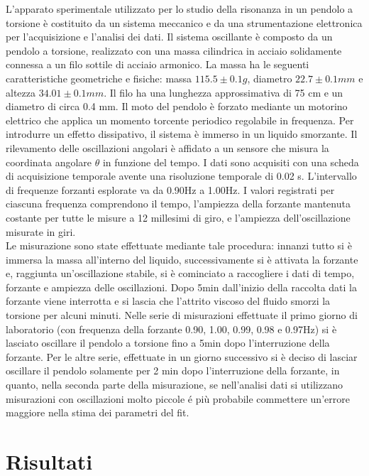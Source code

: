 \documentclass{article}
\begin{document}
L’apparato sperimentale utilizzato per lo studio della risonanza in un pendolo a torsione è costituito da un sistema meccanico e da una strumentazione elettronica per l’acquisizione e l’analisi dei dati. Il sistema oscillante è composto da un pendolo a torsione, realizzato con una massa cilindrica in acciaio solidamente connessa a un filo sottile di acciaio armonico. La massa ha le seguenti caratteristiche geometriche e fisiche: massa $115.5\pm0.1g$, diametro $22.7\pm0.1mm$ e altezza $34.01\pm0.1mm$. Il filo ha una lunghezza approssimativa di 75 cm e un diametro di circa 0.4 mm.
Il moto del pendolo è forzato mediante un motorino elettrico che applica un momento torcente periodico regolabile in frequenza. Per introdurre un effetto dissipativo, il sistema è immerso in un liquido smorzante.
Il rilevamento delle oscillazioni angolari è affidato a un sensore che misura la coordinata angolare $\theta$ in funzione del tempo. I dati sono acquisiti con una scheda di acquisizione temporale avente una risoluzione temporale di 0.02 s. L’intervallo di frequenze forzanti esplorate va da 0.90Hz a 1.00Hz. I valori registrati per ciascuna frequenza comprendono il tempo, l’ampiezza della forzante mantenuta costante per tutte le misure a 12 millesimi di giro, e l’ampiezza dell’oscillazione misurate in giri.
\\
Le misurazione sono state effettuate mediante tale procedura: innanzi tutto si è immersa la massa all'interno del liquido, successivamente si è attivata la forzante e, raggiunta un'oscillazione stabile, si è cominciato a raccogliere i dati di tempo, forzante e ampiezza delle oscillazioni. Dopo 5min dall'inizio della raccolta dati la forzante viene interrotta e si lascia che l'attrito viscoso del fluido smorzi la torsione per alcuni minuti. Nelle serie di misurazioni effettuate il primo giorno di laboratorio (con frequenza della forzante 0.90, 1.00, 0.99, 0.98 e 0.97Hz) si è lasciato oscillare il pendolo a torsione fino a 5min dopo l'interruzione della forzante. Per le altre serie, effettuate in un giorno successivo si è deciso di lasciar oscillare il pendolo solamente per 2 min dopo l'interruzione della forzante, in quanto, nella seconda parte della misurazione, se nell'analisi dati si utilizzano misurazioni con oscillazioni molto piccole é più probabile commettere un'errore maggiore nella stima dei parametri del fit.

\newpage
\section{Risultati}
\end{document}
